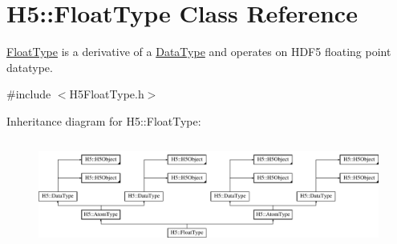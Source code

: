 \hypertarget{class_h5_1_1_float_type}{}\section{H5\+:\+:Float\+Type Class Reference}
\label{class_h5_1_1_float_type}


\hyperlink{class_h5_1_1_float_type}{Float\+Type} is a derivative of a \hyperlink{class_h5_1_1_data_type}{Data\+Type} and operates on H\+D\+F5 floating point datatype.  




{\ttfamily \#include $<$H5\+Float\+Type.\+h$>$}

Inheritance diagram for H5\+:\+:Float\+Type\+:\begin{figure}[H]
\begin{center}
\leavevmode
\includegraphics[height=3.571428cm]{class_h5_1_1_float_type}
\end{center}
\end{figure}
